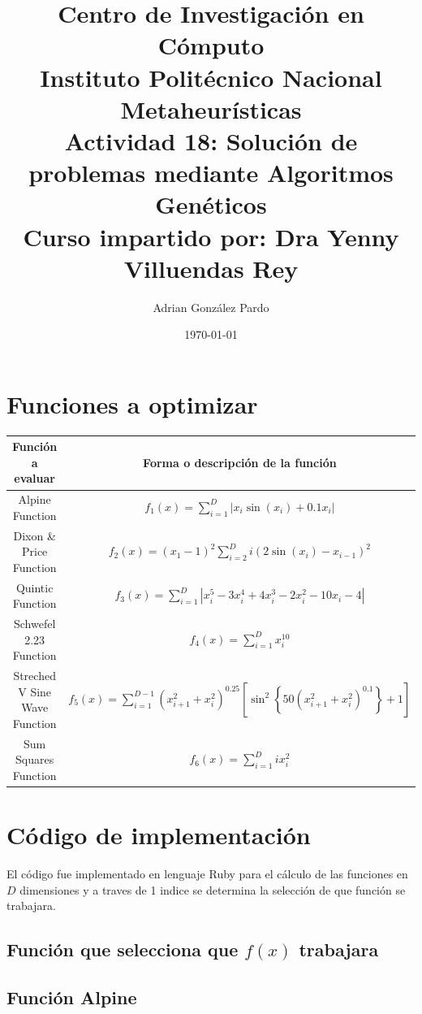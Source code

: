 \documentclass[10pt]{article}
\title{Centro de Investigación en Cómputo\\Instituto Politécnico Nacional\\Metaheurísticas\\Actividad 18: Solución de problemas mediante Algoritmos Genéticos\\Curso impartido por: Dra Yenny Villuendas Rey}
\author{Adrian González Pardo}
\date{\today}
\begin{document}
\maketitle
\section{Funciones a optimizar}
\begin{center}
  \begin{tabular}{|c|c|}
    \hline
    Función a evaluar & Forma o descripción de la función\\
    \hline
    Alpine Function & \(\displaystyle f_{1}(x)=\sum_{i=1}^{D} \left|x_{i}\sin(x_{i})+0.1x_{i}\right|\) \\
    \hline
    Dixon \& Price Function & \(\displaystyle f_{2}(x)=(x_{1}-1)^{2}\sum_{i=2}^{D} i\left(2\sin(x_{i})-x_{i-1}\right)^{2}\)\\
    \hline
    Quintic Function & \(\displaystyle f_{3}(x)=\sum_{i=1}^{D} \left|x_{i}^{5}-3x_{i}^{4}+4x_{i}^3-2x_{i}^{2}-10x_{i}-4\right|\)\\
    \hline
    Schwefel 2.23 Function & \(\displaystyle f_{4}(x)=\sum_{i=1}^{D}x_{i}^{10}\)\\
    \hline
    Streched V Sine Wave Function & \(\displaystyle f_{5}(x)=\sum_{i=1}^{D-1}(x_{i+1}^{2}+x_{i}^{2})^{0.25}\left[\sin^{2}\left\{50(x_{i+1}^{2}+x_{i}^{2})^{0.1}\right\}+1\right]\)\\
    \hline
    Sum Squares Function & \(\displaystyle f_{6}(x)=\sum_{i=1}^{D}ix_{i}^{2}\)\\
    \hline
  \end{tabular}
\end{center}
\clearpage
\section{Código de implementación}
El código fue implementado en lenguaje Ruby para el cálculo de las funciones en $D$ dimensiones y a traves de 1 indice se determina la selección de que función se trabajara.
\subsection{Función que selecciona que $f(x)$ trabajara}
\begin{center}
  
\end{center}
\subsection{Función Alpine}
\begin{center}
  
\end{center}
\end{document}
